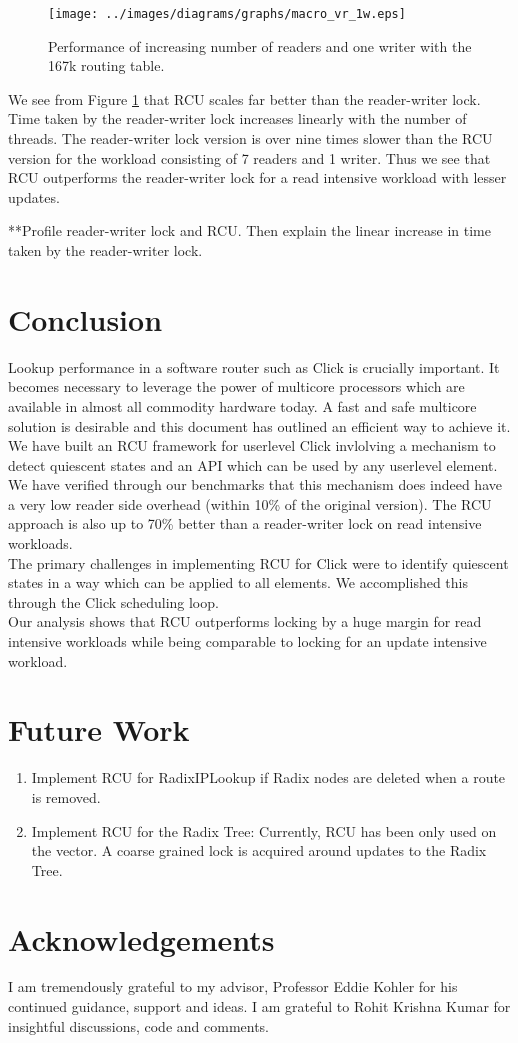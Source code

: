 \documentclass{article}
\begin{document}
\begin{figure}[tph]
\texttt{[image: ../images/diagrams/graphs/macro\_vr\_1w.eps]}
\caption{Performance of increasing number of readers and one writer with the 167k routing table.}
\label{chart:167kwriter}
\end{figure}
 
We see from Figure \ref{chart:167kwriter} that RCU scales far better
than the reader-writer lock. Time taken by the reader-writer lock
increases linearly with the number of threads. The reader-writer lock
version is over nine times slower than the RCU version for the
workload consisting of 7 readers and 1 writer. Thus we see that RCU
outperforms the reader-writer lock for a read intensive workload with
lesser updates.

**Profile reader-writer lock and RCU. Then explain the linear increase
in time taken by the reader-writer lock.


\section{Conclusion}
Lookup performance in a software router such as Click is crucially
important. It becomes necessary to leverage the power of multicore
processors which are available in almost all commodity hardware
today. A fast and safe multicore solution is desirable and this
document has outlined an efficient way to achieve it.\\

We have built an RCU framework for userlevel Click invlolving a
mechanism to detect quiescent states and an API which can be used by
any userlevel element. We have verified through our benchmarks that
this mechanism does indeed have a very low reader side overhead
(within 10\% of the original version). The RCU approach is also up to
70\% better than a reader-writer lock on read intensive workloads.\\

The primary challenges in implementing RCU for Click were to
identify quiescent states in a way which can be applied to all
elements. We accomplished this through the Click scheduling loop.\\

Our analysis shows that RCU outperforms locking by a huge margin
for read intensive workloads while being comparable to locking for an
update intensive workload.
\section{Future Work}
\begin{enumerate}
\item Implement RCU for RadixIPLookup if Radix nodes are deleted when a route is removed.
\item Implement RCU for the Radix Tree: Currently, RCU has been only used on the vector. A coarse grained lock is acquired around updates to the Radix Tree.
\end{enumerate}
\section{Acknowledgements}
I am tremendously grateful to my advisor, Professor Eddie Kohler for his continued guidance, support and ideas.
I am grateful to Rohit Krishna Kumar for insightful discussions, code and comments.


\end{document}
